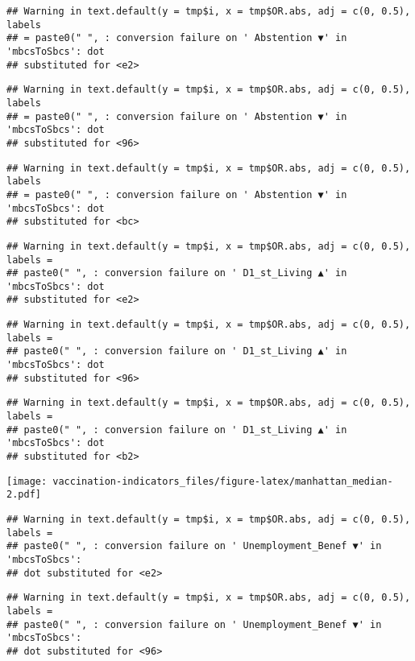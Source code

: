 \documentclass[
]{article}
\begin{document}
\begin{verbatim}
## Warning in text.default(y = tmp$i, x = tmp$OR.abs, adj = c(0, 0.5), labels
## = paste0(" ", : conversion failure on ' Abstention ▼' in 'mbcsToSbcs': dot
## substituted for <e2>
\end{verbatim}

\begin{verbatim}
## Warning in text.default(y = tmp$i, x = tmp$OR.abs, adj = c(0, 0.5), labels
## = paste0(" ", : conversion failure on ' Abstention ▼' in 'mbcsToSbcs': dot
## substituted for <96>
\end{verbatim}

\begin{verbatim}
## Warning in text.default(y = tmp$i, x = tmp$OR.abs, adj = c(0, 0.5), labels
## = paste0(" ", : conversion failure on ' Abstention ▼' in 'mbcsToSbcs': dot
## substituted for <bc>
\end{verbatim}

\begin{verbatim}
## Warning in text.default(y = tmp$i, x = tmp$OR.abs, adj = c(0, 0.5), labels =
## paste0(" ", : conversion failure on ' D1_st_Living ▲' in 'mbcsToSbcs': dot
## substituted for <e2>
\end{verbatim}

\begin{verbatim}
## Warning in text.default(y = tmp$i, x = tmp$OR.abs, adj = c(0, 0.5), labels =
## paste0(" ", : conversion failure on ' D1_st_Living ▲' in 'mbcsToSbcs': dot
## substituted for <96>
\end{verbatim}

\begin{verbatim}
## Warning in text.default(y = tmp$i, x = tmp$OR.abs, adj = c(0, 0.5), labels =
## paste0(" ", : conversion failure on ' D1_st_Living ▲' in 'mbcsToSbcs': dot
## substituted for <b2>
\end{verbatim}

\texttt{[image: vaccination-indicators\_files/figure-latex/manhattan\_median-2.pdf]}

\begin{verbatim}
## Warning in text.default(y = tmp$i, x = tmp$OR.abs, adj = c(0, 0.5), labels =
## paste0(" ", : conversion failure on ' Unemployment_Benef ▼' in 'mbcsToSbcs':
## dot substituted for <e2>
\end{verbatim}

\begin{verbatim}
## Warning in text.default(y = tmp$i, x = tmp$OR.abs, adj = c(0, 0.5), labels =
## paste0(" ", : conversion failure on ' Unemployment_Benef ▼' in 'mbcsToSbcs':
## dot substituted for <96>
\end{verbatim}
\end{document}
